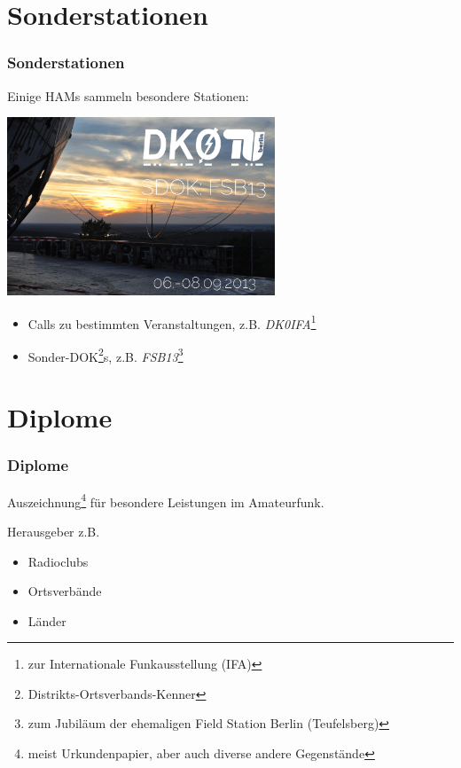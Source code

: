 \section{Sonderstationen}

\begin{frame}
    \frametitle{Sonderstationen}

    Einige HAMs sammeln besondere Stationen:

    \begin{center}
        \includegraphics[width=0.6\textwidth]{bv13/DK0TU_SDOK_FSB13.jpg}
    \end{center}

    \begin{itemize}
        \item Calls zu bestimmten Veranstaltungen, z.B.
              \emph{DK0IFA}\footnote{zur Internationale Funkausstellung (IFA)}
        \item Sonder-DOK\footnote{Distrikts-Ortsverbands-Kenner}s, z.B.
              \emph{FSB13}\footnote{zum Jubiläum der ehemaligen Field Station
              Berlin (Teufelsberg)}
    \end{itemize}

\end{frame}

\section{Diplome}

\begin{frame}
    \frametitle{Diplome}


    Auszeichnung\footnote{meist Urkundenpapier, aber auch diverse andere
    Gegenstände} für besondere Leistungen im Amateurfunk.

    Herausgeber z.B.

    \begin{itemize}
        \item Radioclubs
        \item Ortsverbände
        \item Länder
    \end{itemize}
    
\end{frame}


